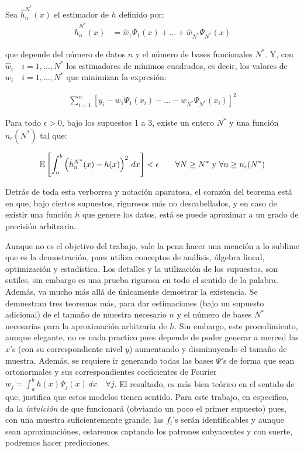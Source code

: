 \documentclass[../Main/Main.tex]{subfiles}
\begin{document}
\begin{theorem} \label{teo:ConvergenciaBerg}
	Sea $\hat{h}_n^{N^*}(x)$ el estimador de $h$ definido por:
	\begin{align}
		\hat{h}_n^{N^*}(x) &= \hat{w}_1\Psi_1(x) + \ldots + \hat{w}_{N^*}\Psi_{N^*}(x) \label{ec:hGorro}
	\end{align}

que depende del número de datos $n$ y el número de bases funcionales $N^*$. Y, con $\hat{w}_i\quad i = 1,\ldots,N^*$ los estimadores de mínimos cuadrados, es decir, los valores de $w_i\quad i = 1,\ldots,N^*$ que minimizan la expresión:

\begin{align}
	\sum_{i = 1}^n \left[y_i - w_1\Psi_1(x_i) - \ldots - w_{N^*}\Psi_{N^*}(x_i)\right]^2 \label{ec:MinCuadBerg}
\end{align}

Para todo $\epsilon > 0$, bajo los supuestos 1 a 3, existe un entero $N^*$ y una función $n_{\epsilon}(N^*)$ tal que:

\begin{align}
	\mathbb{E}\left[ \int_a^b \left(\hat{h}_n^{N^*}(x) - h(x)\right)^2 \,dx \right] < \epsilon \qquad \forall N \geq N^* \text{ y } \forall n \geq n_{\epsilon}(N^*) \label{ec:TeoremaBerg}
\end{align} 
\end{theorem}

Detrás de toda esta verborrea y notación aparatosa, el corazón del teorema está en que, bajo ciertos supuestos, rigurosos más no descabellados, y en caso de existir una función $h$ que genere los datos, está se puede aproximar a un grado de precisión arbitraria. 

Aunque no es el objetivo del trabajo, vale la pena hacer una mención a lo sublime que es la demostración, pues utiliza conceptos de análisis, álgebra lineal, optimización y estadística. Los detalles y la utilización de los supuestos, son sutiles, sin embargo es una prueba rigurosa en todo el sentido de la palabra. Además,  \autocite{bergstrom1985estimation} va mucho más allá de únicamente demostrar la existencia. Se demuestran tres teoremas más, para dar estimaciones (bajo un supuesto adicional) de el tamaño de muestra necesario $n$ y el número de bases $N^*$ necesarias para la aproximación arbitraria de $h$. Sin embargo, este procedimiento, aunque elegante, no es nada practico pues depende de poder generar a merced las $x$'s (con su correspondiente nivel $y$) aumentando y disminuyendo el tamaño de muestra. Además, se requiere ir generando todas las bases $\Psi$'s de forma que sean ortonormales y sus correspondientes coeficientes de Fourier $w_j = \int_a^bh(x)\Psi_j(x)\,dx \quad \forall j$. El resultado, es más bien teórico en el sentido de que, justifica que estos modelos tienen sentido. Para este trabajo, en especifico, da la \textit{intuición} de que funcionará (obviando un poco el primer supuesto) pues, con una muestra suficientemente grande, las $f_i$'s serán identificables y aunque sean aproximaciónes, estaremos captando los patrones subyacentes y con suerte, podremos hacer predicciones. 
\end{document}
